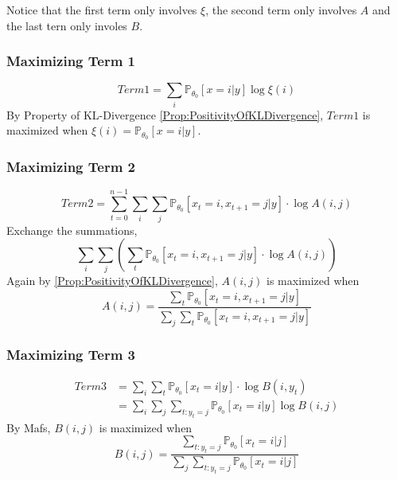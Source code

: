         Notice that the first term only involves $\xi$, the second term only involves $A$ and the last tern only involes $B$.

        \subsubsection{Maximizing Term 1}
        \[ Term1 = \sum_i \mathbb{P}_{\theta_0}[x=i|y]\log\xi(i) \]
        By Property of KL-Divergence \ref{Prop:PositivityOfKLDivergence}, $Term1$ is maximized when $\xi(i) = \mathbb{P}_{\theta_0}[x=i|y]$.

        \subsubsection{Maximizing Term 2}
        \[ Term2 = \sum_{t=0}^{n-1}\sum_i\sum_j \mathbb{P}_{\theta_0}[x_t=i,x_{t+1}=j|y] \cdot \log A(i,j) \]
        Exchange the summations,
        \[ \sum_i\sum_j \left(\sum_t \mathbb{P}_{\theta_0}[x_t=i,x_{t+1}=j|y] \cdot \log A(i,j)\right) \]
        Again by \ref{Prop:PositivityOfKLDivergence}, $A(i,j)$ is maximized when
        \[ A(i,j) = \frac{\sum_t \mathbb{P}_{\theta_0}[x_t=i,x_{t+1}=j|y]}{\sum_j\sum_t \mathbb{P}_{\theta_0}[x_t=i,x_{t+1}=j|y]} \]

        \subsubsection{Maximizing Term 3}
        \begin{align*}
            Term3 &= \sum_i \sum_t \mathbb{P}_{\theta_0}[x_t=i|y]\cdot\log B(i,y_t)\\
            &= \sum_i \sum_j \sum_{t:y_t=j}\mathbb{P}_{\theta_0}[x_t=i|y]\log B(i,j)
        \end{align*}
        By Mafs, $B(i,j)$ is maximized when
        \[ B(i,j) = \frac{\sum_{t:y_t=j}\mathbb{P}_{\theta_0}[x_t=i|j]}{\sum_j\sum_{t:y_t=j}\mathbb{P}_{\theta_0}[x_t=i|j]} \]
